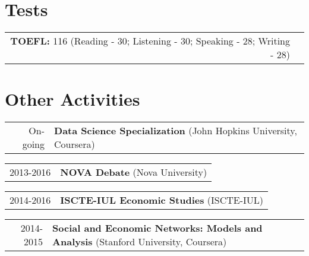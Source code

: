 \documentclass[a4paper,11pt]{article} %
\begin{document}
\section[Tests]{\faLaptop \hspace{3pt} Tests}
\begin{tabular}{rp{13cm}}
\textbf{TOEFL:} 116 (Reading - 30; Listening - 30; Speaking - 28; Writing - 28)
	
\end{tabular}



\section[Other Activities]{\faCubes \hspace{3pt} Other Activities}

\begin{tabular}{r|p{13cm}}
	 On-going & \textbf{Data Science Specialization} (John Hopkins University, Coursera)
\end{tabular}

\begin{tabular}{r|p{13cm}}
	2013-2016 & \textbf{NOVA Debate} (Nova University)
\end{tabular}

\begin{tabular}{r|p{13cm}}
	2014-2016 & \textbf{ISCTE-IUL Economic Studies} (ISCTE-IUL)
\end{tabular}

\begin{tabular}{r|p{13cm}}
	2014-2015 & \textbf{Social and Economic Networks: Models and Analysis} (Stanford University, Coursera)
\end{tabular}

%
\end{document}
